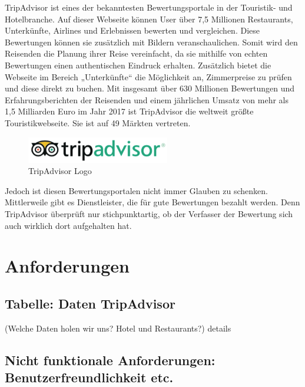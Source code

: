 \documentclass[a4paper,oneside,12pt]{report}
\begin{document}
			TripAdvisor ist eines der bekanntesten Bewertungsportale in der Touristik- und Hotelbranche.
			Auf dieser Webseite können User über 7,5 Millionen Restaurants, Unterkünfte, Airlines und Erlebnissen bewerten und vergleichen. Diese Bewertungen können sie zusätzlich mit Bildern veranschaulichen. Somit wird den Reisenden die Planung ihrer Reise vereinfacht, da sie mithilfe von echten Bewertungen einen authentischen Eindruck erhalten. 
			Zusätzlich bietet die Webseite im Bereich „Unterkünfte“ die Möglichkeit an, Zimmerpreise zu prüfen und diese direkt zu buchen. Mit insgesamt über 630 Millionen Bewertungen und Erfahrungsberichten der Reisenden und einem jährlichen Umsatz von mehr als 1,5 Milliarden Euro im Jahr 2017 \cite{bib-statista} ist TripAdvisor die weltweit größte Touristikwebseite. Sie ist auf 49 Märkten vertreten. \cite{bib-taMedia}
			
			\begin{figure}[H]
				\centering
				\begin{minipage}[b]{0.4\textwidth}
					\includegraphics[width=\textwidth]{Bilder/LogoTripadvisor.png}
				\end{minipage}
				\centering
				\caption[TripAdvisor Logo]{TripAdvisor Logo}
				\label{pic-taLogo}
			\end{figure}
			
			Jedoch ist diesen Bewertungsportalen nicht immer Glauben zu schenken. Mittlerweile gibt es Dienstleister, die für gute Bewertungen bezahlt werden. Denn TripAdvisor überprüft nur stichpunktartig, ob der Verfasser der Bewertung sich auch wirklich dort aufgehalten hat. \cite{bib-taSued}
	
	
	\chapter{Anforderungen}	
	
		\section{Tabelle: Daten TripAdvisor}
		
		(Welche Daten holen wir uns? Hotel und Restaurants?) details
	
		\section{Nicht funktionale Anforderungen: Benutzerfreundlichkeit etc.}
	
\end{document}
